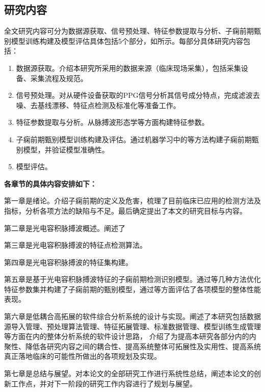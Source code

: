 \subsection{研究内容}
全文研究内容可分为数据源获取、信号预处理、特征参数提取与分析、子痫前期甄别模型训练构建及模型评估具体包括5个部分，如所示。每部分具体研究内容包括：
\begin{enumerate}
    \item 数据源获取。介绍本研究所采用的数据来源（临床现场采集），包括采集设备、采集流程及规范。  
    \item 信号预处理。对从硬件设备获取的PPG信号分析其信号成分特点，完成滤波去噪、去基线漂移、特征点检测及标准化等准备工作。
    \item 特征参数提取与分析。从脉搏波形态学等方面构建特征参数。
    \item 子痫前期甄别模型训练构建及评估。通过机器学习中的等方法构建子痫前期甄别模型，并验证模型准确性。
    \item 模型评估。
\end{enumerate}

\textbf{各章节的具体内容安排如下：}

第一章是绪论。介绍子痫前期的定义及危害，梳理了目前临床已应用的检测方法及指标，分析各项方法的缺陷与不足。最后确定提出了本文的研究目标与内容。

第二章是光电容积脉搏波概述。阐述了

第三章是光电容积脉搏波的特征点检测算法。

第四章是光电容积脉搏波的特征集构建。

第五章是基于光电容积脉搏波特征的子痫前期检测识别模型。通过等几种方法优化特征参数集并构建了子痫前期的甄别模型，通过等方面评估了各项模型的整体性能表现。

第六章是低耦合高拓展的软件综合分析系统的设计与实现。阐述了本研究包括数据源导入管理、预处理算法管理、特征拓展管理、标准数据管理、模型训练生成管理等方面在内的整体分析系统的软件设计思路，
介绍了为提高本研究各部分内的内聚性、降低各研究内容之间的耦合性、提高系统整体可拓展性及实用性、提高系统真正落地临床的可能性所做出的各项规划及实现。

第七章是总结与展望。对本论文的全部研究工作进行系统性总结，阐述本论文的创新工作点，并对下一阶段的研究工作内容进行了规划与展望。